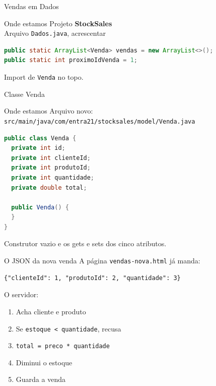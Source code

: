 \documentclass[aspectratio=169,11pt]{beamer}
\newcommand{\onde}[1]{%
  \begin{block}{Onde estamos}
    #1
  \end{block}
}
\begin{document}
\begin{frame}[fragile]{Vendas em Dados}
  \onde{Projeto \textbf{StockSales}\\
        Arquivo \texttt{Dados.java}, acrescentar}

\begin{lstlisting}[language=Java,basicstyle=\ttfamily\footnotesize]
public static ArrayList<Venda> vendas = new ArrayList<>();
public static int proximoIdVenda = 1;
\end{lstlisting}

  Import de \texttt{Venda} no topo.
\end{frame}

\begin{frame}[fragile]{Classe Venda}
  \onde{Arquivo novo:\\
        \texttt{src/main/java/com/entra21/stocksales/model/Venda.java}}

\begin{lstlisting}[language=Java,basicstyle=\ttfamily\footnotesize]
public class Venda {
  private int id;
  private int clienteId;
  private int produtoId;
  private int quantidade;
  private double total;

  public Venda() {
  }
}
\end{lstlisting}

  Construtor vazio e os gets e sets dos cinco atributos.
\end{frame}

\begin{frame}[fragile]{O JSON da nova venda}
  A página \texttt{vendas-nova.html} já manda:

\begin{lstlisting}[basicstyle=\ttfamily\footnotesize]
{"clienteId": 1, "produtoId": 2, "quantidade": 3}
\end{lstlisting}

  \vspace{0.4em}
  O servidor:
  \begin{enumerate}
    \item Acha cliente e produto
    \item Se \texttt{estoque < quantidade}, recusa
    \item \texttt{total = preco * quantidade}
    \item Diminui o estoque
    \item Guarda a venda
  \end{enumerate}
\end{frame}
\end{document}
